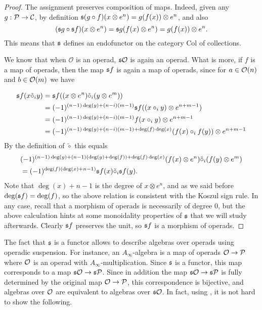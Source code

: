 \documentclass[Thesis.tex]{subfiles}
\begin{document}
\begin{proof}
The assignment preserves composition of maps. Indeed, given any $g:\mathcal{P}\to{\mathcal C}$, by definition $\mathfrak{s}(g\circ f)(x\otimes e^n)=g(f(x))\otimes e^n$, and also \[(\mathfrak{s} g\circ \mathfrak{s} f)(x\otimes e^n)=\mathfrak{s} g (f(x)\otimes e^n)=g(f(x))\otimes e^n.\] This means that $\mathfrak{s}$ defines an endofunctor on the category $\mathrm{Col}$ of collections.


We know that when $\mathcal{O}$ is an operad, $\mathfrak{s}{\mathcal O}$ is again an operad. What is more, if $f$ is a map of operads, then the map $\mathfrak{s} f$ is again a map of operads, since for $a\in{\mathcal O}(n)$ and $b\in{\mathcal O}(m)$ we have

\begin{align*}
\mathfrak{s} f(x\tilde{\circ}_i y)&=\mathfrak{s} f ((x\otimes e^n)\tilde{\circ}_i (y\otimes e^m))\\
&=(-1)^{(n-1)\deg(y)+(n-i)(m-1)}\mathfrak{s} f((x\circ_i y) \otimes e^{n+m-1})\\
&=(-1)^{(n-1)\deg(y)+(n-i)(m-1)}f(x\circ_i y)\otimes e^{n+m-1}\\
&=(-1)^{(n-1)\deg(y)+(n-i)(m-1)+\deg(f)\deg(x)}(f(x)\circ_i f(y))\otimes e^{n+m-1}
\end{align*}
By the definition of $\tilde{\circ}$ this equals
\begin{align*}
&(-1)^{(n-1)\deg(y)+(n-1)(\deg(y)+\deg(f))+\deg(f)\deg(x)}(f(x)\otimes e^n)\tilde{\circ}_i (f(y)\otimes e^m)\\
&=(-1)^{\deg(f)(\deg(x)+n-1)}\mathfrak{s} f(x)\tilde{\circ}_i\mathfrak{s} f(y).
\end{align*}
Note that $\deg(x)+n-1$ is the degree of $x\otimes e^n$, and as we said before $\deg(\mathfrak{s} f)=\deg(f)$, so the above relation is consistent with the Koszul sign rule. In any case, recall that a morphism of operads is necessarily of degree 0, but the above calculation hints at some monoidality properties of $\mathfrak{s}$ that we will study afterwards. Clearly $\mathfrak{s} f$ preserves the unit, so $\mathfrak{s} f$ is a morphism of operads. 
\end{proof}



The fact that $\mathfrak{s}$ is a functor allows to describe algebras over operads using operadic suspension. For instance, an $A_\infty$-algebra is a map of operads ${\mathcal O}\to\mathcal{P}$ where ${\mathcal O}$ is an operad with $A_\infty$-multiplication. Since $\mathfrak{s}$ is a functor, this map corresponds to a map $\mathfrak{s}{\mathcal O}\to\mathfrak{s}\mathcal{P}$. Since in addition the map $\mathfrak{s}{\mathcal O}\to\mathfrak{s}\mathcal{P}$ is fully determined by the original map ${\mathcal O}\to\mathcal{P}$, this correspondence is bijective, and algebras over ${\mathcal O}$ are equivalent to algebras over $\mathfrak{s}{\mathcal O}$. In fact, using , it is not hard to show the following.
\end{document}

